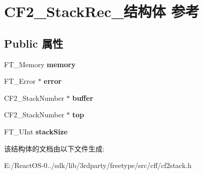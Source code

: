 \hypertarget{struct_c_f2___stack_rec__}{}\section{C\+F2\+\_\+\+Stack\+Rec\+\_\+结构体 参考}
\label{struct_c_f2___stack_rec__}
\subsection*{Public 属性}
\begin{DoxyCompactItemize}
\item 
\mbox{\label{struct_c_f2___stack_rec___a880701944e594f978aff99d217cc4899}} 
F\+T\+\_\+\+Memory {\bfseries memory}
\item 
\mbox{\label{struct_c_f2___stack_rec___adc203c76a21f137d30cd65ac59bf3218}} 
F\+T\+\_\+\+Error $\ast$ {\bfseries error}
\item 
\mbox{\label{struct_c_f2___stack_rec___a2071b7490fbfd34cdcad9911d0f6076d}} 
C\+F2\+\_\+\+Stack\+Number $\ast$ {\bfseries buffer}
\item 
\mbox{\label{struct_c_f2___stack_rec___a47ed15c7a113befa0358afcdf54b4d4b}} 
C\+F2\+\_\+\+Stack\+Number $\ast$ {\bfseries top}
\item 
\mbox{\label{struct_c_f2___stack_rec___a0bd7a9c702f467a5eccf7a6edf431834}} 
F\+T\+\_\+\+U\+Int {\bfseries stack\+Size}
\end{DoxyCompactItemize}


该结构体的文档由以下文件生成\+:\begin{DoxyCompactItemize}
\item 
E\+:/\+React\+O\+S-\/0../sdk/lib/3rdparty/freetype/src/cff/cf2stack.\+h\end{DoxyCompactItemize}
